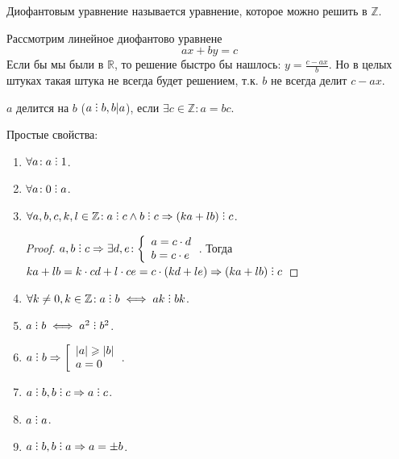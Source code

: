 \begin{definition}
    Диофантовым уравнение называется уравнение, которое можно решить в $\mathbb{Z}$.
\end{definition}
Рассмотрим линейное диофантово уравнене \[
 ax+by=c
\] 
Если бы мы были в $\mathbb{R}$, то решение быстро бы нашлось: $y = \frac{c - ax}{b}$. Но в целых штуках такая штука не всегда будет решением, т.к. $b$ не всегда делит $c - ax$.
 \begin{definition}
     $a$ делится на $b$ ($a \divby b, b \vert a$), если $\exists c \in \mathbb{Z}: a = bc$.
\end{definition}
Простые свойства:
\begin{enumerate}
    \item             
            $\forall a\!: a \divby 1$.
    \item
            $\forall a\!: 0 \divby a$.
    \item
        $\forall a, b, c, k, l \in \Z\!: a \divby c \land b \divby c \Rightarrow (ka + lb) \divby c$.
            \begin{proof}
                $a, b \divby c \Rightarrow \exists d, e\!: \left\{\begin{array}{l} a = c \cdot d \\ b = c \cdot e \end{array}\right.$. Тогда  $ka + lb = k \cdot cd + l \cdot ce = c \cdot (kd + le) \Rightarrow (ka + lb) \divby c$
            \end{proof}
    \item
            $\forall k \neq 0, k \in \mathbb{Z}\!: a \divby b \iff ak \divby bk$.
    \item
            $a \divby b \iff a^2 \divby b^2$.
    \item
            $a \divby b \Rightarrow \left[ \begin{array}{l} |a| \ge |b| \\ a = 0 \end{array} \right.$.
    \item
            $a \divby b, b \divby c \Rightarrow a \divby c$.
    \item 
            $a \divby a$.
    \item 
            $a \divby b, b \divby a \Rightarrow a = \pm b$.
\end{enumerate}

